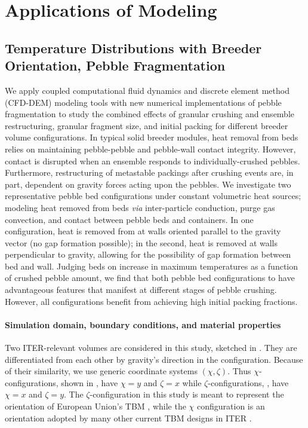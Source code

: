 \chapter{Applications of Modeling}\label{sec:dem-studies}

\section{Temperature Distributions with Breeder Orientation, Pebble Fragmentation}\label{sec:isfnt-12}


We apply coupled computational fluid dynamics and discrete element method (CFD-DEM) modeling tools with new numerical implementations of pebble fragmentation to study the combined effects of granular crushing and ensemble restructuring, granular fragment size, and initial packing for different breeder volume configurations. In typical solid breeder modules, heat removal from beds relies on maintaining pebble-pebble and pebble-wall contact integrity. However, contact is disrupted when an ensemble responds to individually-crushed pebbles. Furthermore, restructuring of metastable packings after crushing events are, in part, dependent on gravity forces acting upon the pebbles. We investigate two representative pebble bed configurations under constant volumetric heat sources; modeling heat removed from beds \textit{via} inter-particle conduction, purge gas convection, and contact between pebble beds and containers. In one configuration, heat is removed from at walls oriented parallel to the gravity vector (no gap formation possible); in the second, heat is removed at walls perpendicular to gravity, allowing for the possibility of gap formation between bed and wall. Judging beds on increase in maximum temperatures as a function of crushed pebble amount, we find that both pebble bed configurations to have advantageous features that manifest at different stages of pebble crushing. However, all configurations benefit from achieving high initial packing fractions.



\subsubsection{Simulation domain, boundary conditions, and material properties}

Two ITER-relevant volumes are considered in this study, sketched in . They are differentiated from each other by gravity's direction in the configuration. Because of their similarity, we use generic coordinate systems $(\chi, \zeta)$. Thus $\chi$-configurations, shown in , have $\chi = y$ and $\zeta = x$ while $\zeta$-configurations, , have $\chi = x$ and $\zeta = y$. The $\zeta$-configuration in this study is meant to represent the orientation of European Union's TBM \cite{Hernandez2013}, while the $\chi$ configuration is an orientation adopted by many other current TBM designs in ITER \cite{Cho2008,Feng2012a}.

